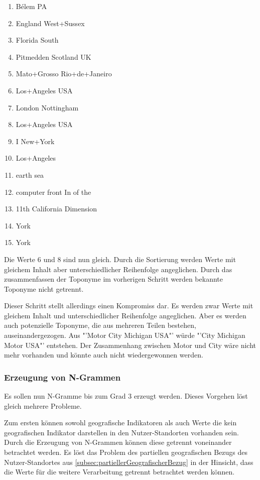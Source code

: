 				\begin{multicols}{2}
					\begin{enumerate}
						\item Bélem PA
						\item England West+Sussex
						\item Florida South
						\item Pitmedden Scotland UK
						\item Mato+Grosso Rio+de+Janeiro
						\item Los+Angeles USA
						\item London Nottingham
						\item Los+Angeles USA
						\item I New+York 
						\item Los+Angeles
						\item earth sea
						\item computer front In of the 
						\item 11th California Dimension 
						\item York
						\item York
					\end{enumerate}
				\end{multicols}

				Die Werte 6 und 8 sind nun gleich. 
				Durch die Sortierung werden Werte mit gleichem Inhalt aber unterschiedlicher Reihenfolge angeglichen.
				Durch das zusammenfassen der Toponyme im vorherigen Schritt werden bekannte Toponyme nicht getrennt.

				Dieser Schritt stellt allerdings einen Kompromiss dar.
				Es werden zwar Werte mit gleichem Inhalt und unterschiedlicher Reihenfolge angeglichen.
				Aber es werden auch potenzielle Toponyme, die aus mehreren Teilen bestehen, auseinandergezogen.
				Aus "'Motor City Michigan USA"' würde "'City Michigan Motor USA"' entstehen.
				Der Zusammenhang zwischen Motor und City wäre nicht mehr vorhanden und könnte auch nicht wiedergewonnen werden.

			\subsubsection{Erzeugung von N-Grammen}

				Es sollen nun N-Gramme bis zum Grad 3 erzeugt werden. 
				Dieses Vorgehen löst gleich mehrere Probleme.

				Zum ersten können sowohl geografische Indikatoren als auch Werte die kein geografischen Indikator darstellen in den Nutzer-Standorten vorhanden sein.
				Durch die Erzeugung von N-Grammen können diese getrennt voneinander betrachtet werden.
				Es löst das Problem des partiellen geografischen Bezugs des Nutzer-Standortes aus \ref{subsec:partiellerGeografischerBezug} in der Hinsicht, dass die Werte für die weitere Verarbeitung getrennt betrachtet werden können.

